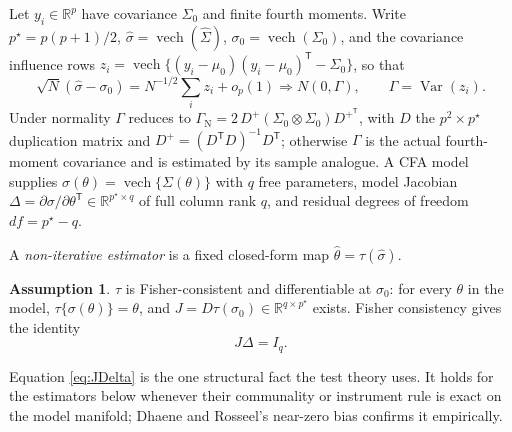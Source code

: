 \documentclass[11pt]{article}
\newcommand{\Var}{\operatorname{Var}}
\newcommand{\vech}{\operatorname{vech}}
\newcommand{\T}{^{\mathsf T}}
\newcommand{\Ninv}{^{-1}}
\theoremstyle{plain}
\theoremstyle{definition}
\newtheorem{assumption}{Assumption}
\theoremstyle{remark}
\begin{document}
Let $y_i\in\mathbb R^p$ have covariance $\Sigma_0$ and finite fourth moments.
Write $p^\star=p(p+1)/2$, $\hat\sigma=\vech(\widehat\Sigma)$,
$\sigma_0=\vech(\Sigma_0)$, and the covariance influence rows
$z_i=\vech\{(y_i-\mu_0)(y_i-\mu_0)\T-\Sigma_0\}$, so that
\begin{equation}\label{eq:clt}
  \sqrt N(\hat\sigma-\sigma_0)=N^{-1/2}\sum_i z_i+o_p(1)
  \Rightarrow N(0,\Gamma),\qquad \Gamma=\Var(z_i).
\end{equation}
Under normality $\Gamma$ reduces to
$\Gamma_{\mathrm N}=2\,D^{+}(\Sigma_0\otimes\Sigma_0)D^{+\T}$, with $D$ the
$p^2\times p^\star$ duplication matrix and $D^{+}=(D\T D)\Ninv D\T$; otherwise
$\Gamma$ is the actual fourth-moment covariance and is estimated by its sample
analogue. A CFA model supplies $\sigma(\theta)=\vech\{\Sigma(\theta)\}$ with
$q$ free parameters, model Jacobian $\Delta=\partial\sigma/\partial\theta\T\in
\mathbb R^{p^\star\times q}$ of full column rank $q$, and residual degrees of
freedom $df=p^\star-q$.

A \emph{non-iterative estimator} is a fixed closed-form map
$\hat\theta=\tau(\hat\sigma)$.

\begin{assumption}\label{ass:reg}
$\tau$ is Fisher-consistent and differentiable at $\sigma_0$: for every $\theta$
in the model, $\tau\{\sigma(\theta)\}=\theta$, and $J=D\tau(\sigma_0)\in
\mathbb R^{q\times p^\star}$ exists. Fisher consistency gives the identity
\begin{equation}\label{eq:JDelta}
  J\Delta=I_q .
\end{equation}
\end{assumption}

Equation \eqref{eq:JDelta} is the one structural fact the test theory uses. It
holds for the estimators below whenever their communality or instrument rule is
exact on the model manifold; Dhaene and Rosseel's near-zero bias confirms it
empirically.
\end{document}
